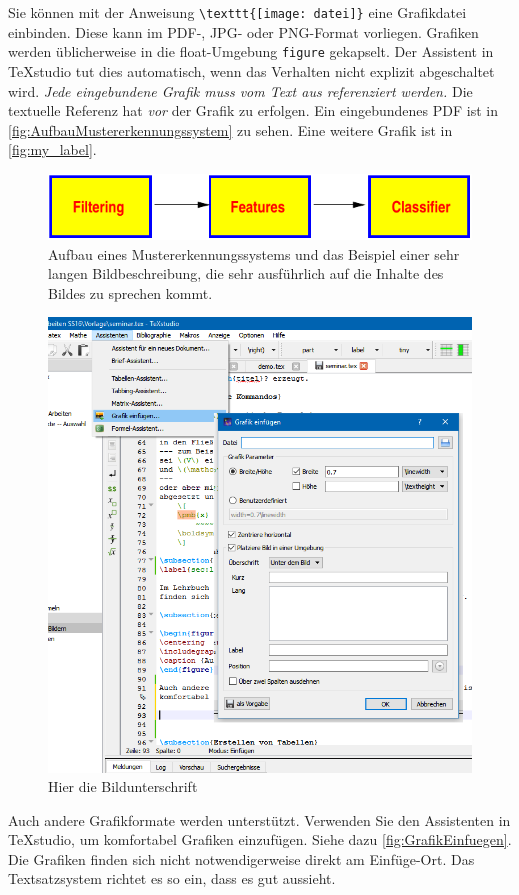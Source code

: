 Sie können mit der Anweisung \lstinline|\texttt{[image: datei]}| eine Grafikdatei einbinden. Diese kann im PDF-, JPG- oder PNG-Format vorliegen. Grafiken werden üblicherweise in die float-Umgebung \lstinline|figure| gekapselt. Der Assistent in TeXstudio \autocite{vanderZander2018} tut dies automatisch, wenn das Verhalten nicht explizit abgeschaltet wird. \textit{Jede eingebundene Grafik muss vom Text aus referenziert werden.} Die textuelle Referenz hat \textit{vor} der Grafik zu erfolgen. Ein eingebundenes PDF ist in \autoref{fig:AufbauMustererkennungssystem} zu sehen. Eine weitere Grafik ist in \autoref{fig:my_label}.

\begin{figure}
\centering
\includegraphics [width=0.5\linewidth] {bilder/bildchen.pdf}
\caption [Aufbau eines Mustererkennungssystems]{Aufbau eines Mustererkennungssystems und das Beispiel einer sehr langen Bildbeschreibung, die sehr ausführlich auf die Inhalte des Bildes zu sprechen kommt. \autocite{Oechsner2015}}
\label{fig:AufbauMustererkennungssystem}
\end{figure}

\begin{figure}
    \centering
    \includegraphics[width=0.5\linewidth] {bilder/GrafikEinfuegen.png}
    \caption{Hier die Bildunterschrift}
    \label{fig:my_label}
\end{figure}

Auch andere Grafikformate werden unterstützt. Verwenden Sie den Assistenten in TeXstudio, um komfortabel Grafiken einzufügen. Siehe dazu \autoref{fig:GrafikEinfuegen}. Die Grafiken finden sich nicht notwendigerweise direkt am Einfüge-Ort. Das Textsatzsystem richtet es so ein, dass es gut aussieht.

